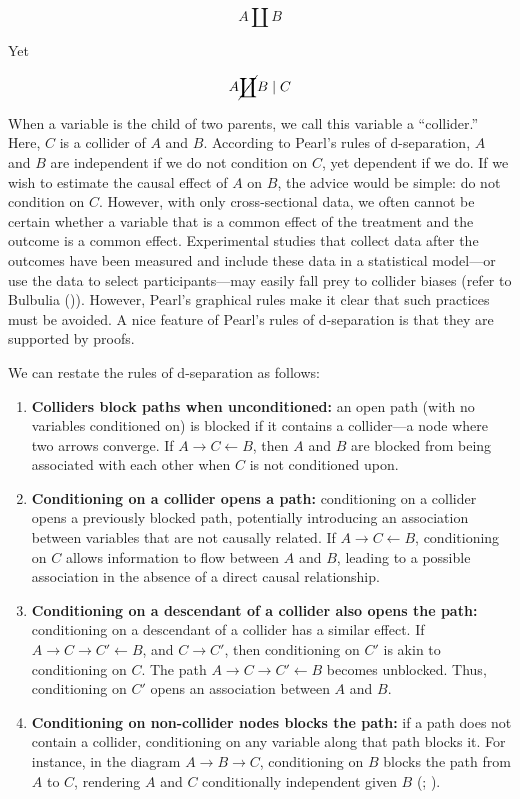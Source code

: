 \documentclass[
  singlecolumn]{article}
\begin{document}
\[
A \coprod B
\]

Yet

\[
A \cancel{\coprod} B \mid C
\]

When a variable is the child of two parents, we call this variable a
``collider.'' Here, \(C\) is a collider of \(A\) and \(B\). According to
Pearl's rules of d-separation, \(A\) and \(B\) are independent if we do
not condition on \(C\), yet dependent if we do. If we wish to estimate
the causal effect of \(A\) on \(B\), the advice would be simple: do not
condition on \(C\). However, with only cross-sectional data, we often
cannot be certain whether a variable that is a common effect of the
treatment and the outcome is a common effect. Experimental studies that
collect data after the outcomes have been measured and include these
data in a statistical model---or use the data to select
participants---may easily fall prey to collider biases (refer to
Bulbulia ()). However,
Pearl's graphical rules make it clear that such practices must be
avoided. A nice feature of Pearl's rules of d-separation is that they
are supported by proofs.

We can restate the rules of d-separation as follows:

\begin{enumerate}
\def\labelenumi{\arabic{enumi}.}
\item
  \textbf{Colliders block paths when unconditioned:} an open path (with
  no variables conditioned on) is blocked if it contains a collider---a
  node where two arrows converge. If
  \(A \rightarrow \boxed{C} \leftarrow B\), then \(A\) and \(B\) are
  blocked from being associated with each other when \(C\) is not
  conditioned upon.
\item
  \textbf{Conditioning on a collider opens a path:} conditioning on a
  collider opens a previously blocked path, potentially introducing an
  association between variables that are not causally related. If
  \(A \rightarrow \boxed{C} \leftarrow B\), conditioning on \(C\) allows
  information to flow between \(A\) and \(B\), leading to a possible
  association in the absence of a direct causal relationship.
\item
  \textbf{Conditioning on a descendant of a collider also opens the
  path:} conditioning on a descendant of a collider has a similar
  effect. If \(A \rightarrow C \rightarrow \boxed{C'} \leftarrow B\),
  and \(C \to C'\), then conditioning on \(C'\) is akin to conditioning
  on \(C\). The path
  \(A \rightarrow C \rightarrow \boxed{C'} \leftarrow B\) becomes
  unblocked. Thus, conditioning on \(C'\) opens an association between
  \(A\) and \(B\).
\item
  \textbf{Conditioning on non-collider nodes blocks the path:} if a path
  does not contain a collider, conditioning on any variable along that
  path blocks it. For instance, in the diagram
  \(A \rightarrow \boxed{B} \rightarrow C\), conditioning on \(B\)
  blocks the path from \(A\) to \(C\), rendering \(A\) and \(C\)
  conditionally independent given \(B\)
  (;
  ).
\end{enumerate}
\end{document}
